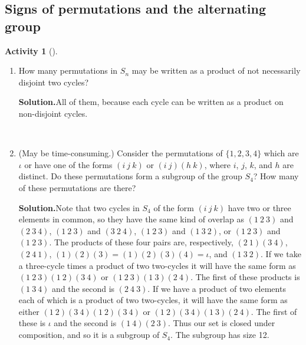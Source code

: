 \documentclass[10pt,]{book}
\theoremstyle{plain}
\theoremstyle{definition}
\newtheorem{activity}[project]{Activity}
\numberwithin{equation}{chapter}
\begin{document}
\subsection[{Signs of permutations and the alternating group}]{Signs of permutations and the alternating group}\label{subsection-63}
\begin{activity}[]\label{activity-259}
~\par
\begin{enumerate}[label=(\alph*)]
 \item How many permutations in \(S_n\) may be written as a product of not necessarily disjoint two cycles?%
\par\medskip\noindent%
\textbf{Solution.}\quad All of them, because each cycle can be written as a product on non-disjoint cycles.%

~\par
\item (May be time-consuming.) Consider the permutations of \(\{1,2,3,4\}\) which are \(\iota\) or have one of the forms \((i\ j\ k)\) or \((i\ j)(h\ k)\), where \(i\), \(j\), \(k\), and \(h\) are distinct.  Do these permutations form a subgroup of the group \(S_4\)?  How many of these permutations are there?%
\par\medskip\noindent%
\textbf{Solution.}\quad Note that two cycles in \(S_4\) of the form \((i\ j\ k)\) have two or three elements in common, so they have the same kind of overlap as \((1\ 2\ 3)\) and \((2\ 3\
4)\), \((1\ 2\ 3)\) and \((3\ 2\ 4)\), \((1\ 2\ 3)\) and \((1\ 3\ 2)\), or \((1\ 2\ 3)\) and \((1\
2\ 3)\). The products of these four pairs are, respectively, \((2\ 1)(3\ 4)\), \((2\ 4\
1)\), \((1)(2)(3)= (1)(2)(3)(4)=\iota\), and \((1\ 3\ 2)\). If we take a three-cycle times a product of two two-cycles it will have the same form as \((1\ 2\ 3)(1\ 2)(3\ 4)\) or \((1\ 2\ 3)(1\ 3)(2\ 4)\). The first of these products is \((1\ 3\ 4)\) and the second is \((2\ 4\ 3)\). If we have a product of two elements each of which is a product of two two-cycles, it will have the same form as either \((1\ 2)(3\ 4)(1\ 2)(3\ 4)\) or \((1\ 2)(3\ 4)(1\ 3)(2\ 4)\). The first of these is \(\iota\) and the second is \((1\
4)(2\ 3)\). Thus our set is closed under composition, and so it is a subgroup of \(S_4\). The subgroup has size 12.%

\end{enumerate}
\end{activity}
\end{document}
